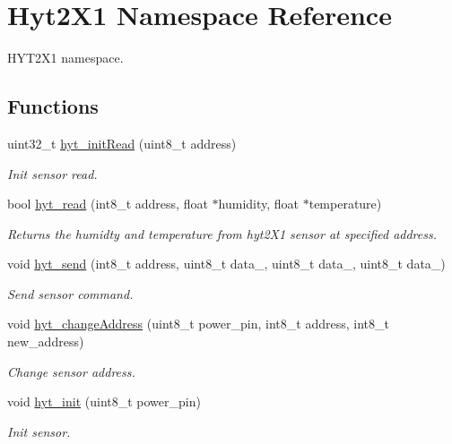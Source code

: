\hypertarget{namespaceHyt2X1}{}\section{Hyt2\+X1 Namespace Reference}
\label{namespaceHyt2X1}


H\+Y\+T2\+X1 namespace.  


\subsection*{Functions}
\begin{DoxyCompactItemize}
\item 
uint32\+\_\+t \hyperlink{namespaceHyt2X1_a240a988351da007adac832e7ffb851c9}{hyt\+\_\+init\+Read} (uint8\+\_\+t address)
\begin{DoxyCompactList}\small\item\em Init sensor read. \end{DoxyCompactList}\item 
bool \hyperlink{namespaceHyt2X1_a69220922c024c6ab149fee8ad4080a5d}{hyt\+\_\+read} (int8\+\_\+t address, float $\ast$humidity, float $\ast$temperature)
\begin{DoxyCompactList}\small\item\em Returns the humidty and temperature from hyt2\+X1 sensor at specified address. \end{DoxyCompactList}\item 
void \hyperlink{namespaceHyt2X1_a968bbf2c9acb17b73e0d7d5ac12bf575}{hyt\+\_\+send} (int8\+\_\+t address, uint8\+\_\+t data\+\_, uint8\+\_\+t data\+\_, uint8\+\_\+t data\+\_)
\begin{DoxyCompactList}\small\item\em Send sensor command. \end{DoxyCompactList}\item 
void \hyperlink{namespaceHyt2X1_a50b36c601c9bddb5c26ca1b0b9d36458}{hyt\+\_\+change\+Address} (uint8\+\_\+t power\+\_\+pin, int8\+\_\+t address, int8\+\_\+t new\+\_\+address)
\begin{DoxyCompactList}\small\item\em Change sensor address. \end{DoxyCompactList}\item 
void \hyperlink{namespaceHyt2X1_ae551ea888fff17a685ded74f1ef12635}{hyt\+\_\+init} (uint8\+\_\+t power\+\_\+pin)
\begin{DoxyCompactList}\small\item\em Init sensor. \end{DoxyCompactList}\item 

\end{DoxyCompactItemize}
